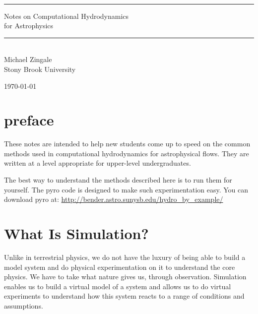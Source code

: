 \documentclass[11pt]{book}
\newcommand{\HRule}{\rule{\linewidth}{0.125mm}}
\renewcommand{\chaptermark}[1]{%
 \markboth{\chaptername
\ \thechapter.\ #1}{}}
\begin{document}
\frontmatter

\begin{titlepage}

\ \\[2.5in]
\begin{center}
\HRule
{\Huge \textsf{{
Notes on Computational Hydrodynamics\\ for Astrophysics}}
}
\HRule
\\[2em]

{\Large \sf Michael Zingale} \\ {\sf Stony Brook University}
\end{center}

\vfill

\begin{flushright}
\today
\end{flushright}

\end{titlepage}

\setcounter{tocdepth}{2}
\tableofcontents

\clearpage

\listoffigures
{}

\clearpage

\listofexercise

\clearpage

\chapter*{preface}
\chaptermark{preface}


These notes are intended to help new students come up to speed on the
common methods used in computational hydrodynamics for astrophysical
flows.  They are written at a level appropriate for upper-level
undergraduates.

The best way to understand the methods described here is to run
them for yourself.  The {\sf pyro} code is designed to make such
experimentation easy.  You can download {\sf pyro} at: 
\url{http://bender.astro.sunysb.edu/hydro_by_example/}

\clearpage

\mainmatter


\chapter{What Is Simulation?}

Unlike in terrestrial physics, we do not have the luxury of being able
to build a model system and do physical experimentation on it to understand
the core physics.  We have to take what nature gives us, through observation.
Simulation enables us to build a virtual model of a system and allows us
to do virtual experiments to understand how this system reacts to a range
of conditions and assumptions.  
\end{document}
